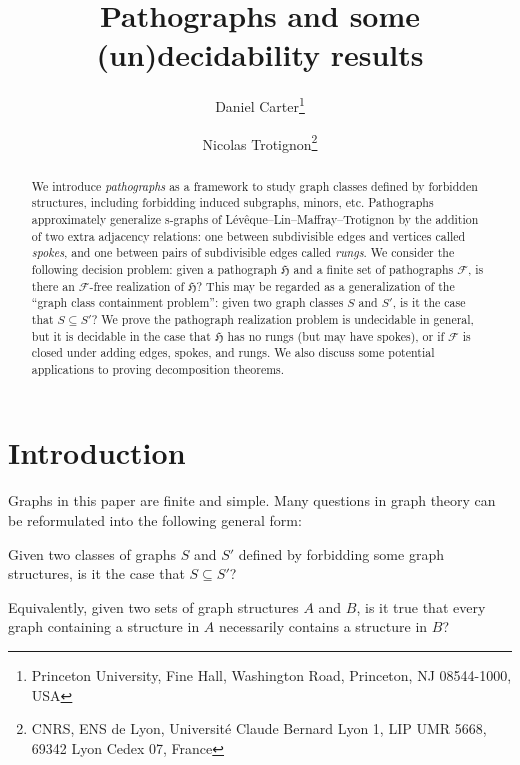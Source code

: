 \documentclass{article}
\title{Pathographs and some (un)decidability results}
\author{Daniel Carter\thanks{Princeton University, Fine Hall, Washington Road, Princeton, NJ 08544-1000, USA}\and Nicolas Trotignon\thanks{CNRS, ENS de Lyon, Universit\'e Claude Bernard Lyon 1, LIP UMR 5668, 69342 Lyon Cedex 07, France}}
\date{}
\newcommand{\Fc}{\mathcal{F}}
\newcommand{\Hf}{\mathfrak{H}}
\begin{document}
\maketitle

\begin{abstract}
We introduce \textit{pathographs} as a framework to study graph classes defined by forbidden structures, including forbidding induced subgraphs, minors, etc. Pathographs approximately generalize s-graphs of L\'ev\^eque--Lin--Maffray--Trotignon by the addition of two extra adjacency relations: one between subdivisible edges and vertices called \textit{spokes}, and one between pairs of subdivisible edges called \textit{rungs}. We consider the following decision problem: given a pathograph $\Hf$ and a finite set of pathographs $\Fc$, is there an $\Fc$-free realization of $\Hf$? This may be regarded as a generalization of the ``graph class containment problem'': given two graph classes $S$ and $S'$, is it the case that $S\subseteq S'$? We prove the pathograph realization problem is undecidable in general, but it is decidable in the case that $\Hf$ has no rungs (but may have spokes), or if $\Fc$ is closed under adding edges, spokes, and rungs. We also discuss some potential applications to proving decomposition theorems.
\end{abstract}

\section{Introduction}

Graphs in this paper are finite and simple. Many questions in graph theory can be reformulated into the following general form:

\begin{problem}\label{prob:general}
Given two classes of graphs $S$ and $S'$ defined by forbidding some graph structures, is it the case that $S\subseteq S'$?

Equivalently, given two sets of graph structures $A$ and $B$, is it true that every graph containing a structure in $A$ necessarily contains a structure in $B$?
\end{problem}
\end{document}
